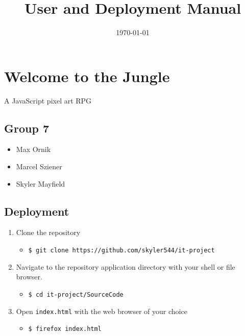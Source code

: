 \documentclass[11pt]{article}
\date{\today}
\title{User and Deployment Manual}
\begin{document}
\maketitle
\tableofcontents



\section{Welcome to the Jungle}
\label{sec:org8b7dcf8}
A JavaScript pixel art RPG\\

\subsection{Group 7}
\label{sec:org7968f93}
\begin{itemize}
\item Max Ornik\\
\item Marcel Sziener\\
\item Skyler Mayfield\\
\end{itemize}

\subsection{Deployment}
\label{sec:org993be74}
\begin{enumerate}
\item Clone the repository\\
\begin{itemize}
\item \texttt{\$ git clone https://github.com/skyler544/it-project}\\
\end{itemize}
\item Navigate to the repository application directory with your shell or file browser.\\
\begin{itemize}
\item \texttt{\$ cd it-project/SourceCode}\\
\end{itemize}
\item Open \texttt{index.html} with the web browser of your choice\\
\begin{itemize}
\item \texttt{\$ firefox index.html}\\
\end{itemize}
\end{enumerate}
\end{document}
